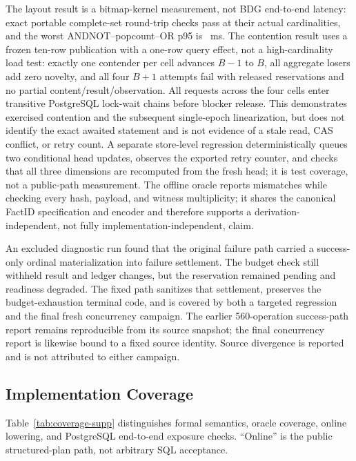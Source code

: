 \documentclass[journal,onecolumn]{IEEEtran}
\begin{document}
The layout result is a bitmap-kernel measurement, not BDG end-to-end
latency: \RQFourVFourDistributionRoundTrips{} exact portable complete-set
round-trip checks pass at their actual cardinalities, and the worst
ANDNOT--popcount--OR p95 is
\RQFourVFourDistributionWorstTailMS{}~ms. The contention result uses a frozen
ten-row publication with a one-row query effect, not a high-cardinality load
test: exactly one contender per
cell advances $B-1$ to $B$, all \RQFourVFourConcurrencyZeroNovelty{} aggregate
losers add zero novelty, and all four $B+1$ attempts fail with released
reservations and no partial content/result/observation. All
\RQFourVFourRootLockWaiters{} requests across the four cells enter transitive
PostgreSQL lock-wait chains before blocker release. This demonstrates exercised
contention and the subsequent single-epoch linearization, but does not identify
the exact awaited statement and is not evidence of a stale read, CAS conflict,
or retry count. A separate store-level regression deterministically queues two
conditional head updates, observes the exported retry counter, and checks that
all three dimensions are recomputed from the fresh head; it is test coverage,
not a public-path measurement. The offline oracle reports
\RQFourVFourOracleMismatches{} mismatches while checking every hash, payload,
and witness multiplicity; it shares the canonical FactID specification and
encoder and therefore supports a derivation-independent, not fully
implementation-independent, claim.

An excluded diagnostic run found that the original failure path carried a
success-only ordinal materialization into failure settlement. The budget check
still withheld result and ledger changes, but the reservation remained pending
and readiness degraded. The fixed path sanitizes that settlement, preserves the
budget-exhaustion terminal code, and is covered by both a targeted regression
and the final fresh concurrency campaign. The earlier 560-operation
success-path report remains reproducible from its source snapshot; the final
concurrency report is likewise bound to a fixed source identity. Source
divergence is reported and is not attributed to either campaign.

\subsection{Implementation Coverage}

Table~\ref{tab:coverage-supp} distinguishes formal semantics, oracle coverage,
online lowering, and PostgreSQL end-to-end exposure checks. ``Online'' is the
public structured-plan path, not arbitrary SQL acceptance.
\end{document}
